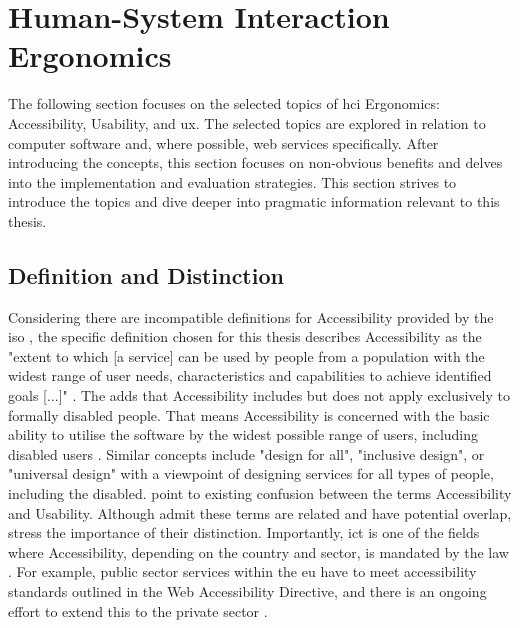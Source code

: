 \section{Human-System Interaction Ergonomics}

The following section focuses on the selected topics of \gls{hci} Ergonomics: Accessibility, Usability, and \gls{ux}.
The selected topics are explored in relation to computer software and, where possible, web services specifically.
After introducing the concepts, this section focuses on non-obvious benefits and delves into the implementation and evaluation strategies.
This section strives to introduce the topics and dive deeper into pragmatic information relevant to this thesis.

\subsection{Definition and Distinction}
\label{Literature-HSIE-Definition}

Considering there are incompatible definitions for Accessibility provided by the \gls{iso} \parencite{Wegge_Zimmermann_2007}, the specific definition chosen for this thesis describes Accessibility as the "extent to which [a service] can be used by people from a population with the widest range of user needs, characteristics and capabilities to achieve identified goals [...]" \parencite{ISO_9241-11:2018}.
The \textcite{ISO_10779:2020} adds that Accessibility includes but does not apply exclusively to formally disabled people.
That means Accessibility is concerned with the basic ability to utilise the software by the widest possible range of users, including disabled users \parencite{Wegge_Zimmermann_2007}.
Similar concepts include "design for all", "inclusive design", or "universal design" \parencite[p. 1210]{Juergen_et_all_2020} with a viewpoint of designing services for all types of people, including the disabled.
\textcite{Wegge_Zimmermann_2007} point to existing confusion between the terms Accessibility and Usability.
Although \textcite{Wegge_Zimmermann_2007} admit these terms are related and have potential overlap, \textcite{Wegge_Zimmermann_2007} stress the importance of their distinction.
Importantly, \gls{ict} is one of the fields where Accessibility, depending on the country and sector, is mandated by the law \parencite{Wegge_Zimmermann_2007, Juergen_et_all_2020}.
For example, public sector services within the \gls{eu} have to meet accessibility standards outlined in the Web Accessibility Directive, and there is an ongoing effort to extend this to the private sector \parencite{EU_Web_Accessibility}.

